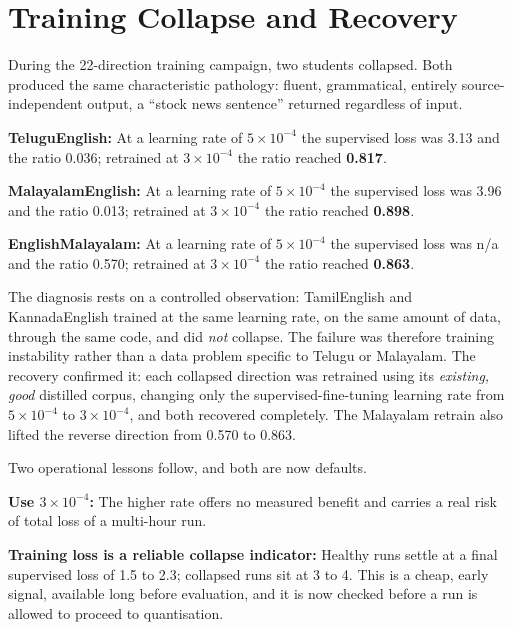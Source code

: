 \section{Training Collapse and Recovery}
\label{sec:collapse}

During the 22-direction training campaign, two students collapsed. Both produced
the same characteristic pathology: fluent, grammatical, entirely
source-independent output, a ``stock news sentence'' returned regardless of
input.

\begin{bullets}
\item \textbf{Telugu\arrowto{}English:} At a learning rate of $5\times10^{-4}$ the supervised loss was 3.13 and the ratio 0.036; retrained at $3\times10^{-4}$ the ratio reached \textbf{0.817}.
\item \textbf{Malayalam\arrowto{}English:} At a learning rate of $5\times10^{-4}$ the supervised loss was 3.96 and the ratio 0.013; retrained at $3\times10^{-4}$ the ratio reached \textbf{0.898}.
\item \textbf{English\arrowto{}Malayalam:} At a learning rate of $5\times10^{-4}$ the supervised loss was n/a and the ratio 0.570; retrained at $3\times10^{-4}$ the ratio reached \textbf{0.863}.
\end{bullets}

The diagnosis rests on a controlled observation: Tamil\arrowto{}English
and Kannada\arrowto{}English trained at the same learning rate, on the same amount
of data, through the same code, and did \emph{not} collapse. The failure was
therefore training instability rather than a data problem specific to Telugu or
Malayalam. The recovery confirmed it: each collapsed direction was retrained
using its \emph{existing, good} distilled corpus, changing only the
supervised-fine-tuning learning rate from $5\times10^{-4}$ to $3\times10^{-4}$,
and both recovered completely. The Malayalam retrain also lifted the reverse
direction from 0.570 to 0.863.

Two operational lessons follow, and both are now defaults.

\textbf{Use $3\times10^{-4}$:} The higher rate offers no measured benefit and
carries a real risk of total loss of a multi-hour run.

\textbf{Training loss is a reliable collapse indicator:} Healthy runs settle at
a final supervised loss of 1.5 to 2.3; collapsed runs sit at 3 to 4. This is a
cheap, early signal, available long before evaluation, and it is now
checked before a run is allowed to proceed to quantisation.

